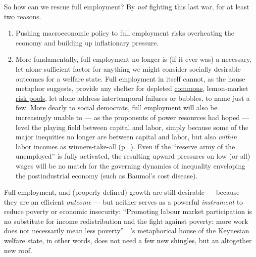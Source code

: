 \begin{description}
	So how can we rescue full employment?
	By \emph{not} fighting this last war, for at least two reasons.

	\begin{enumerate}
		\item Pushing macroeconomic policy to full employment risks overheating the economy and building up inflationary pressure.

		\item More fundamentally, full employment no longer is (if it ever was) a necessary, let alone sufficient factor for anything we might consider socially desirable outcomes for a welfare state.
		Full employment in itself cannot, as the house metaphor suggests, provide any shelter for depleted \hyperref[sec:common-good]{commons}, lemon-market \hyperref[sec:adverse-selection]{risk pools}, let alone address intertemporal failures or bubbles, to name just a few.
		More dearly to social democrats, full employment will also be increasingly unable to --- as the proponents of power resources had hoped --- level the playing field between capital and labor, simply because some of the major inequities no longer are between capital and labor, but also \emph{within} labor incomes as \hyperref[sec:winner-take-all]{winners-take-all} (p.~\pageref{sec:winner-take-all}).
		Even if the ``reserve army of the unemployed'' is fully activated, the resulting upward pressures on low (or all) wages will be no match for the governing dynamics of inequality enveloping the postindustrial economy (such as Baumol's cost disease).
	\end{enumerate}

	Full employment, and (properly defined) growth are still desirable --- because they are an efficient \emph{outcome} --- but neither serves as a powerful \emph{instrument} to reduce poverty or economic insecurity:
	``Promoting labour market participation is no substitute for income redistribution and the fight against poverty:
	more work does not necessarily mean less poverty'' \citep[ix]{Esping-Andersen2002}.
	\citeauthor{Offe2003}'s metaphorical house of the Keynesian welfare state, in other words, does not need a few new shingles, but an altogether new roof.


\end{description}

